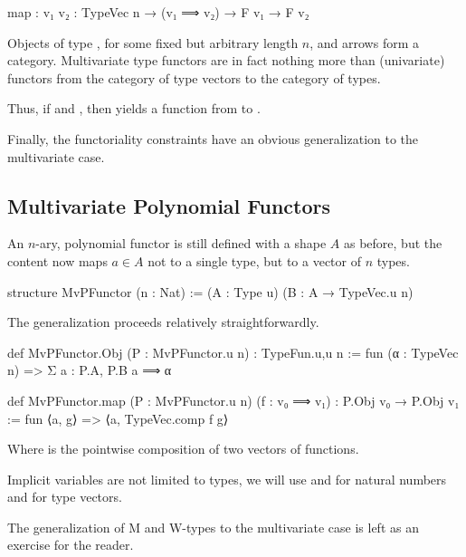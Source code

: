 \begin{leancode}
    map : {v₁ v₂ : TypeVec n} → (v₁ ⟹ v₂) → F v₁ → F v₂
\end{leancode}
\begin{remark}
    Objects of type , for some fixed but arbitrary length $n$, and arrows  form a category. 
    Multivariate type functors are in fact nothing more than (univariate) functors from the category of type vectors to the category of types.
\end{remark}

Thus, if  and , then  yields a function from  to .

Finally, the functoriality constraints have an obvious generalization to the multivariate case.

\subsection*{Multivariate Polynomial Functors}
An $n$-ary, polynomial functor is still defined with a shape $A$ as before, but the content now maps $a ∈ A$ not to a single type, but to a vector of $n$ types.

\begin{leancode}
    structure MvPFunctor (n : Nat) := (A : Type u) (B : A → TypeVec.{u} n)
\end{leancode}

The generalization proceeds relatively straightforwardly.
\begin{leancode}
    def MvPFunctor.Obj (P : MvPFunctor.{u} n) : TypeFun.{u,u} n
        := fun (α : TypeVec n) => Σ a : P.A, P.B a ⟹ α

    def MvPFunctor.map  (P : MvPFunctor.{u} n) 
                        (f : v₀ ⟹ v₁) 
                            : P.Obj v₀ → P.Obj v₁ 
        := fun ⟨a, g⟩ => ⟨a, TypeVec.comp f g⟩
\end{leancode}

Where  is the pointwise composition of two vectors of functions.

\begin{remark}
    Implicit variables are not limited to types, we will use  and  for natural numbers and  for type vectors.
\end{remark}

The generalization of M and W-types to the multivariate case is left as an exercise for the reader.

